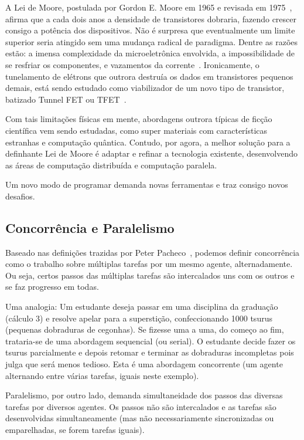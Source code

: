 \documentclass[12pt,a4paper]{article}
\begin{document}
A Lei de Moore, postulada por Gordon E. Moore em 1965 e revisada em 1975~\cite{moore1965cramming}, afirma que a cada dois anos a densidade de transistores dobraria, fazendo crescer consigo a potência dos dispositivos. Não é surpresa que eventualmente um limite superior seria atingido sem uma mudança radical de paradigma. Dentre as razões estão: a imensa complexidade da microeletrônica envolvida, a impossibilidade de se resfriar os componentes, e vazamentos da corrente~\cite{seabaugh2013tunneling}. Ironicamente, o tunelamento de elétrons que outrora destruía os dados em transistores pequenos demais, está sendo estudado como viabilizador de um novo tipo de transistor, batizado Tunnel FET ou TFET~\cite{seabaugh2013tunneling}.

Com tais limitações físicas em mente, abordagens outrora típicas de ficção científica vem sendo estudadas, como super materiais com características estranhas e computação quântica. Contudo, por agora, a melhor solução para a definhante Lei de Moore é adaptar e refinar a tecnologia existente, desenvolvendo as áreas de computação distribuída e computação paralela.

Um novo modo de programar demanda novas ferramentas e traz consigo novos desafios.

\subsection{Concorrência e Paralelismo}
\label{ssec:concorrencia e paralelismo}

Baseado nas definições trazidas por Peter Pacheco~\cite{pacheco11}, podemos definir concorrência como o trabalho sobre múltiplas tarefas por um mesmo agente, alternadamente. Ou seja, certos passos das múltiplas tarefas são intercalados uns com os outros e se faz progresso em todas.

Uma analogia: Um estudante deseja passar em uma disciplina da graduação (cálculo 3) e resolve apelar para a superstição, confeccionando 1000 tsurus (pequenas dobraduras de cegonhas). Se fizesse uma a uma, do começo ao fim, trataria-se de uma abordagem sequencial (ou serial). O estudante decide fazer os tsurus parcialmente e depois retomar e terminar as dobraduras incompletas pois julga que será menos tedioso. Esta é uma abordagem concorrente (um agente alternando entre várias tarefas, iguais neste exemplo).

Paralelismo, por outro lado, demanda simultaneidade dos passos das diversas tarefas por diversos agentes. Os passos não são intercalados e as tarefas são desenvolvidas simultaneamente (mas não necessariamente sincronizadas ou emparelhadas, se forem tarefas iguais).
\end{document}
